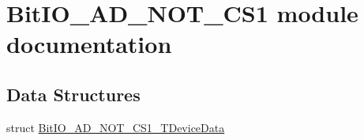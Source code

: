\hypertarget{group___bit_i_o___a_d___n_o_t___c_s1__module}{\section{Bit\-I\-O\-\_\-\-A\-D\-\_\-\-N\-O\-T\-\_\-\-C\-S1 module documentation}
\label{group___bit_i_o___a_d___n_o_t___c_s1__module}
}
\subsection*{Data Structures}
\begin{DoxyCompactItemize}
\item 
struct \hyperlink{struct_bit_i_o___a_d___n_o_t___c_s1___t_device_data}{Bit\-I\-O\-\_\-\-A\-D\-\_\-\-N\-O\-T\-\_\-\-C\-S1\-\_\-\-T\-Device\-Data}
\end{DoxyCompactItemize}
